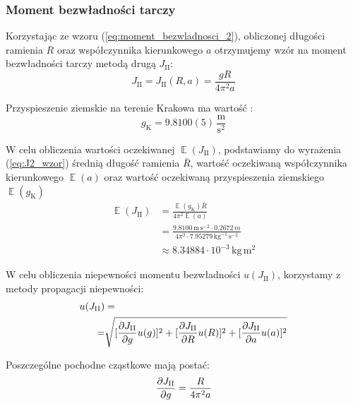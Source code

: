\documentclass[twocolumn, a4paper, polish, 10pt]{article}
\DeclareMathOperator{\EX}{\mathbb{E}}
\begin{document}
\subsubsection{Moment bezwładności tarczy}
Korzystając ze wzoru (\ref{eq:moment_bezwladnosci_2}), obliczonej długości ramienia $R$ oraz współczynnika kierunkowego $a$ otrzymujemy wzór na moment bezwładności tarczy metodą drugą $J_{\mathrm{II}}$:
\begin{equation}
    J_{\mathrm{II}} = J_{\mathrm{II}}(R, a) = \frac{g R}{4 \pi^2 a}
\label{eq:J2_wzor}
\end{equation}

Przyspieszenie ziemskie na terenie Krakowa ma wartość \cite{przyspieszenie_ziemskie_krakow}:
\begin{displaymath}
    g_{\mathrm{K}} = 9.8100(5) \, \mathrm{\frac{m}{s^2}}
\end{displaymath}

W celu obliczenia wartości oczekiwanej $\EX(J_{\mathrm{II}})$, podstawiamy do wyrażenia (\ref{eq:J2_wzor}) średnią długość ramienia $\bar{R}$, wartość oczekiwaną współczynnika kierunkowego $\EX(a)$ oraz wartość oczekiwaną przyspieszenia ziemskiego $\EX(g_{\mathrm{K}})$
\begin{displaymath}
\begin{split}
    \EX(J_{\mathrm{II}})
    &= \frac{\EX(g_{\mathrm{K}}) \bar{R}}{4 \pi^2 \EX(a)} \\
    &= \frac{9.8100 \, \mathrm{m \, s^{-2}} \cdot 0.2672 \, m}
    {4 \pi^2 \cdot 7.95279 \, \mathrm{kg^{-1} \, s^{-2}}} \\
    &\approx 8.34884 \cdot 10^{-3} \, \mathrm{kg \, m^2}
\end{split}
\end{displaymath}

W celu obliczenia niepewności momentu bezwładności $u(J_{\mathrm{II}})$, korzystamy z metody propagacji niepewności:
\begin{displaymath}
\begin{split}
    u(J_{\mathrm{II}}) &= \\
    =& \sqrt{
        [ \pdv{J_{\mathrm{II}}}{g} u(g) ]^2
        + [ \pdv{J_{\mathrm{II}}}{R} u(R) ]^2
        + [ \pdv{J_{\mathrm{II}}}{a} u(a) ]^2
    }
\end{split}
\end{displaymath}

Poszczególne pochodne cząstkowe mają postać:
\begin{displaymath}
    \pdv{J_{\mathrm{II}}}{g} = \frac{R}{4 \pi^2 a}
\end{displaymath}
\end{document}
